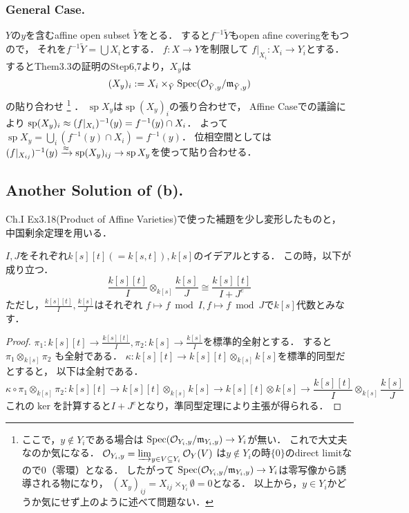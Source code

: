 \documentclass[a4paper]{jsarticle}
\newcommand{\shO}{\mathcal{O}}
\newcommand{\basesp}{\operatorname{sp}}
\begin{document}
    \subsubsection{General Case.}
    $Y$の$y$を含むaffine open subset $\tilde{Y}$をとる．
    すると$f^{-1}\tilde{Y}$もopen afine coveringをもつので，
    それを$f^{-1}\tilde{Y}=\bigcup X_{i}$とする．
    $f: X \to Y$を制限して
    $f|_{X_{i}}: X_{i} \to Y_i$とする．
    するとThem3.3の証明のStep6,7より，$X_y$は
    \[ (X_y)_{i}:=X_{i} \times_{\tilde{Y}} \Spec (\shO_{\tilde{Y},y}/\I{m}_{\tilde{Y},y}) \]
    の貼り合わせ
    \footnote
    {
    ここで，$y \not \in Y_i$である場合は
    $\Spec (\shO_{Y_i,y}/\I{m}_{Y_i,y}) \to Y_i$が無い．
    これで大丈夫なのか気になる．
    $\shO_{Y_i,y}=\varinjlim_{y \in V \subseteq Y_i} \shO_Y(V)$
    は$y \not \in Y_i$の時$\{0\}$のdirect limitなので$0$（零環）となる．
    したがって
    $\Spec (\shO_{Y_i,y}/\I{m}_{Y_i,y}) \to Y_i$は零写像から誘導される物になり，
    $(X_y)_{ij}=X_{ij} \times_{Y_i} \emptyset=0$となる．
    以上から，$y \in Y_i$かどうか気にせず上のように述べて問題ない．
    }
    ．
    $\basesp X_y$は$\basesp (X_y)_{i}$の張り合わせで，
    Affine Caseでの議論により
    $\basesp (X_y)_{i} \homeo (f|_{X_{i}})^{-1}(y)=f^{-1}(y) \cap X_{i}$．
    よって$\basesp X_y=\bigcup_{i} (f^{-1}(y) \cap X_{i})=f^{-1}(y)$．
    位相空間としては
    $(f|_{X_{ij}})^{-1}(y) \homeomap \basesp (X_y)_{ij} \to \basesp X_y$を使って貼り合わせる．

    \subsection{Another Solution of (b).}
    Ch.I Ex3.18(Product of Affine Varieties)で使った補題を少し変形したものと，
    中国剰余定理を用いる．

    \begin{Lemma}
        $I,J$をそれぞれ$k[s][t](=k[s,t]), k[s]$のイデアルとする．
        この時，以下が成り立つ．
        \[ \frac{k[s][t]}{I} \otimes_{k[s]} \frac{k[s]}{J} \cong \frac{k[s][t]}{I+J^e} \]
        ただし，$\frac{k[s][t]}{I}, \frac{k[s]}{J}$はそれぞれ
        $f \mapsto f \bmod I, f \mapsto f \bmod J$で$k[s]$代数とみなす．
    \end{Lemma}
    \begin{proof}
        $\pi_1: k[s][t] \to \frac{k[s][t]}{I}, \pi_2: k[s] \to \frac{k[s]}{I}$を標準的全射とする．
        すると$\pi_1 \otimes_{k[s]} \pi_2$
        も全射である．
        $\kappa: k[s][t] \to k[s][t] \otimes_{k[s]} k[s]$を標準的同型だとすると，
        以下は全射である．
        \[
            \kappa \circ \pi_1 \otimes_{k[s]} \pi_2:
                k[s][t] \to k[s][t] \otimes_{k[s]} k[s]
                \to k[s][t] \otimes k[s]
                \to \frac{k[s][t]}{I} \otimes_{k[s]} \frac{k[s]}{J}
        \]
        これの$\ker$を計算すると$I+J^e$となり，準同型定理により主張が得られる．
    \end{proof}
\end{document}
